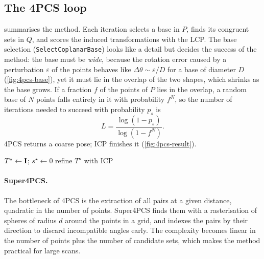 \subsection{The 4PCS loop}

 summarises the method. Each iteration selects a base in $P$, finds its congruent
sets in $Q$, and scores the induced transformations with the LCP. The base selection
(\texttt{SelectCoplanarBase}) looks like a detail but decides the success of the method: the base
must be \emph{wide}, because the rotation error caused by a perturbation $\varepsilon$ of the points
behaves like $\Delta\theta\sim\varepsilon/D$ for a base of diameter $D$ (\cref{fig:4pcs-base}),
yet it must lie in the overlap of the two shapes, which shrinks as the base grows. If a fraction $f$
of the points of $P$ lies in the overlap, a random base of $N$ points falls entirely in it with
probability $f^N$, so the number of iterations needed to succeed with probability $p_s$ is
\begin{equation}
L=\frac{\log(1-p_s)}{\log(1-f^N)} .
\end{equation}
4PCS returns a coarse pose; ICP finishes it (\cref{fig:4pcs-result}).

\begin{algorithm}[tbp]
\caption{4PCS global registration \citep{Aiger2008}.}\label{alg:4pcs}
$T^\star\gets\mathbf{I}$; $s^\star\gets0$\;
refine $T^\star$ with ICP\;
\end{algorithm}


\paragraph{Super4PCS.} The bottleneck of 4PCS is the extraction of all pairs at a given distance,
quadratic in the number of points. Super4PCS \citep{Mellado2014} finds them with a rasterisation of
spheres of radius $d$ around the points in a grid, and indexes the pairs by their direction to
discard incompatible angles early. The complexity becomes linear in the number of points plus the
number of candidate sets, which makes the method practical for large scans.

